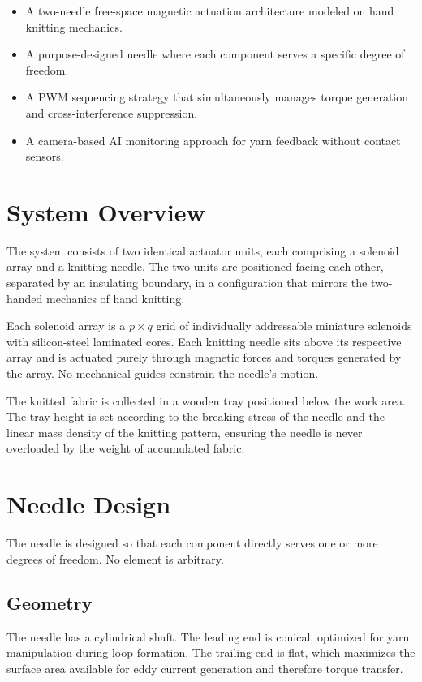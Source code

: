 \documentclass[10pt]{article}
\begin{document}
\begin{itemize}
  \item A two-needle free-space magnetic actuation architecture modeled on hand knitting mechanics.
  \item A purpose-designed needle where each component serves a specific degree of freedom.
  \item A PWM sequencing strategy that simultaneously manages torque generation and cross-interference suppression.
  \item A camera-based AI monitoring approach for yarn feedback without contact sensors.
\end{itemize}

\section{System Overview}
The system consists of two identical actuator units, each comprising a solenoid array and a knitting needle. The two units are positioned facing each other, separated by an insulating boundary, in a configuration that mirrors the two-handed mechanics of hand knitting.

Each solenoid array is a $p\times q$ grid of individually addressable miniature solenoids with silicon-steel laminated cores. Each knitting needle sits above its respective array and is actuated purely through magnetic forces and torques generated by the array. No mechanical guides constrain the needle's motion.

The knitted fabric is collected in a wooden tray positioned below the work area. The tray height is set according to the breaking stress of the needle and the linear mass density of the knitting pattern, ensuring the needle is never overloaded by the weight of accumulated fabric.

\section{Needle Design}
The needle is designed so that each component directly serves one or more degrees of freedom. No element is arbitrary.

\subsection{Geometry}
The needle has a cylindrical shaft. The leading end is conical, optimized for yarn manipulation during loop formation. The trailing end is flat, which maximizes the surface area available for eddy current generation and therefore torque transfer.
\end{document}
